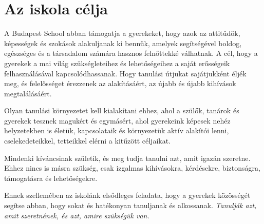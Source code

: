\section{Az iskola célja}
\label{sec:iskola_celja}

A Budapest School abban támogatja a gyerekeket, hogy azok az
attitűdök, képességek és szokások alakuljanak ki bennük, amelyek segítségével
boldog, egészséges és a társadalom számára hasznos felnőttekké válhatnak. A
cél, hogy a gyerekek a mai világ szükségleteihez és lehetőségeihez a saját
erősségeik felhasználásával kapcsolódhassanak.	Hogy tanulási útjukat
sajátjukként éljék meg, és felelősséget érezzenek az alakításáért, az újabb és
újabb kihívások megtalálásáért.

Olyan tanulási környezetet kell kialakítani ehhez, ahol a szülők, tanárok és
gyerekek tesznek magukért és egymásért, ahol gyerekeink képesek nehéz
helyzetekben is életük, kapcsolataik és környezetük aktív alakítói lenni,
cselekedeteikkel, tetteikkel elérni a kitűzött céljaikat.

Mindenki kíváncsinak születik, és meg tudja tanulni azt, amit
igazán szeretne. Ehhez nincs is másra szükség, csak izgalmas kihívásokra, kérdésekre,
biztonságra, támogatásra és lehetőségekre.

Ennek szellemében az iskolánk elsődleges feladata, hogy a gyerekek közösségét
segítse abban, hogy sokat és hatékonyan tanuljanak és alkossanak.
\emph{Tanulják azt, amit szeretnének, és azt, amire szükségük van.}
